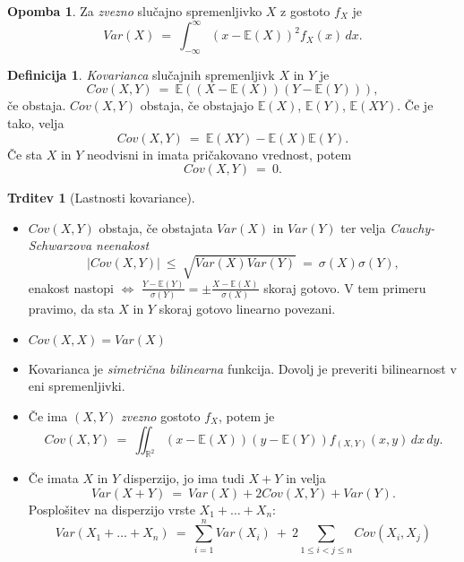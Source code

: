 \documentclass[11pt]{article}
\newcommand{\E}{\mathbb{E}}
\newcommand{\R}{\mathbb{R}}
\newcommand{\1}{\mathbbm{1}}
\theoremstyle{definition}
\newtheorem{definicija}{Definicija}[section]
\theoremstyle{definition}
\newtheorem{trditev}{Trditev}[section]
\theoremstyle{definition}
\newtheorem*{opomba}{Opomba}
\begin{document}
\begin{opomba}

Za \textit{zvezno} slučajno spremenljivko $X$ z gostoto $f_X$ je 
$$Var(X) ~=~ \int_{-\infty}^{\infty}(x - \E(X))^2 f_X(x)\,dx.$$

\end{opomba}
\vspace{0.5cm}

\begin{definicija}

\textit{Kovarianca} slučajnih spremenljivk $X$ in $Y$ je
$$Cov(X, Y) ~=~ \E((X - \E(X))(Y - \E(Y))),$$
če obstaja. $Cov(X,Y)$ obstaja, če obstajajo $\E(X)$, $\E(Y)$, $\E(XY)$. Če je tako, velja
$$Cov(X, Y) ~=~ \E(XY) - \E(X)\E(Y).$$
Če sta $X$ in $Y$ neodvisni in imata pričakovano vrednost, potem 
$$Cov(X, Y) ~=~ 0.$$  

\end{definicija}
\vspace{0.5cm}

\begin{trditev}[Lastnosti kovariance]
~
\begin{itemize}
	\item $Cov(X, Y)$ obstaja, če obstajata $Var(X)$ in $Var(Y)$ ter velja \textit{Cauchy-Schwarzova neenakost}
	$$|Cov(X, Y)| ~\leq~ \sqrt{Var(X)Var(Y)} ~=~ \sigma(X)\sigma(Y),$$
	enakost nastopi $\iff$ $\frac{Y-\E(Y)}{\sigma(Y)} = \pm \frac{X-\E(X)}{\sigma(X)}$ skoraj gotovo. V tem primeru pravimo, da sta $X$ in $Y$ skoraj gotovo linearno povezani.
	
	\item $Cov(X, X) = Var(X)$
	
	\item Kovarianca je \textit{simetrična bilinearna} funkcija. Dovolj je preveriti bilinearnost v eni spremenljivki.
	
	\item Če ima $(X, Y)$ \textit{zvezno} gostoto $f_X$, potem je
	$$Cov(X, Y) ~=~ \iint_{\R^2} (x-\E(X))(y-\E(Y)) f_{(X, Y)}(x, y)\,dx\,dy.$$
	
	\item Če imata $X$ in $Y$ disperzijo, jo ima tudi $X+Y$ in velja
	$$Var(X+Y) ~=~ Var(X) + 2Cov(X, Y) + Var(Y).$$
	Posplošitev na disperzijo vrste $X_1 + \ldots + X_n$:
	$$Var(X_1 + \ldots + X_n) ~=~ \sum_{i=1}^n Var(X_i) ~+~ 2\sum_{1 \leq i < j \leq n} Cov(X_i, X_j)$$
\end{itemize}

\end{trditev}
\vspace{0.5cm}
\end{document}
